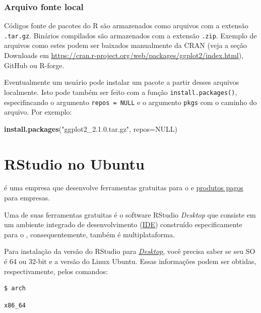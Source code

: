 \documentclass[]{book}
\newenvironment{Shaded}{\begin{snugshade}}{\end{snugshade}}
\newcommand{\KeywordTok}[1]{\textcolor[rgb]{0.13,0.29,0.53}{\textbf{#1}}}
\newcommand{\DataTypeTok}[1]{\textcolor[rgb]{0.13,0.29,0.53}{#1}}
\newcommand{\StringTok}[1]{\textcolor[rgb]{0.31,0.60,0.02}{#1}}
\newcommand{\OtherTok}[1]{\textcolor[rgb]{0.56,0.35,0.01}{#1}}
\newcommand{\NormalTok}[1]{#1}
\begin{document}
\subsubsection{Arquivo fonte local}\label{arquivo-fonte-local}

Códigos fonte de pacotes do R são armazenados como arquivos com a
extensão \texttt{.tar.gz}. Binários compilados são armazenados com a
extensão \texttt{.zip}. Exemplo de arquivos como estes podem ser
baixados manualmente da CRAN (veja a seção Downloads em
\url{https://cran.r-project.org/web/packages/ggplot2/index.html}),
GitHub ou R-forge.

Eventualmente um usuário pode instalar um pacote a partir desses
arquivos localmente. Isto pode também ser feito com a função
\texttt{install.packages()}, especifincando o argumento
\texttt{repos\ =\ NULL} e o argumento \texttt{pkgs} com o caminho do
arquivo. Por exemplo:

\begin{Shaded}
\begin{Highlighting}[]
\KeywordTok{install.packages}\NormalTok{(}\StringTok{"ggplot2_2.1.0.tar.gz"}\NormalTok{, }\DataTypeTok{repos=}\OtherTok{NULL}\NormalTok{)}
\end{Highlighting}
\end{Shaded}

\section{RStudio no Ubuntu}\label{install-rstudio}

 é uma empresa que desenvolve ferramentas gratuitas para o e
\href{https://www.rstudio.com/products/}{produtos pagos} para empresas.

Uma de suas ferramentas gratuitas é o software RStudio \emph{Desktop}
que consiste em um ambiente integrado de desenvolvimento
(\href{http://en.wikipedia.org/wiki/Integrated_development_environment}{IDE})
construído especificamente para o , consequentemente, também é
multiplataforma.

Para instalação da versão do RStudio para
\emph{\href{https://pt.wikipedia.org/wiki/Ambiente_de_desktop}{Desktop}},
você precisa saber se seu SO é 64 ou 32-bit e a versão do Linux Ubuntu.
Essas informações podem ser obtidas, respectivamente, pelos comandos:

\begin{verbatim}
$ arch
\end{verbatim}

\begin{verbatim}
x86_64
\end{verbatim}
\end{document}
